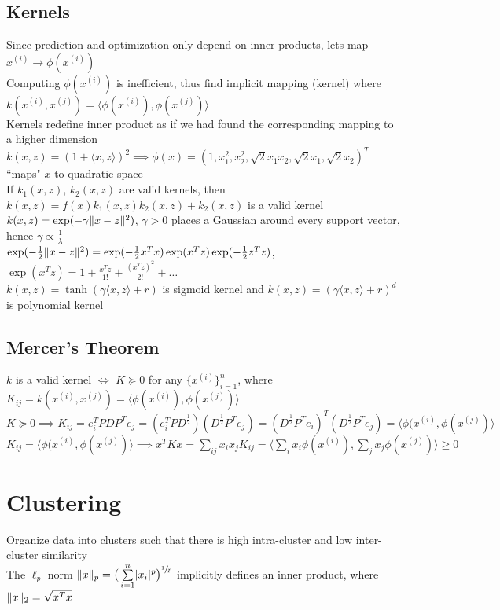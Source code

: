 \documentclass{article}
\newcommand\inner[2]{\langle #1, #2 \rangle}
\DeclarePairedDelimiter\abs{\lvert}{\rvert}
\DeclarePairedDelimiter\norm{\lVert}{\rVert}
\begin{document}
\subsection{Kernels}
Since prediction and optimization only depend on inner products, lets map $x^{(i)} \to \phi(x^{(i)})$ \\
Computing $\phi(x^{(i)})$ is inefficient, thus find implicit mapping (kernel) where $k(x^{(i)}, x^{(j)}) = \inner{\phi(x^{(i)})}{\phi(x^{(j)})}$ \\
Kernels redefine inner product as if we had found the corresponding mapping to a higher dimension \\
$k(x,z) = (1 + \inner{x}{z})^2 \implies \phi(x) = (1, x_1^2, x_2^2, \sqrt{2}x_1x_2, \sqrt{2}x_1, \sqrt{2}x_2)^T$ ``maps" $x$ to quadratic space \\
If $k_1(x, z)$, $k_2(x, z)$ are valid kernels, then $k(x, z) = f(x)k_1(x, z)k_2(x, z) + k_2(x, z)$ is a valid kernel \\
$k(x, z) = \exp(-\gamma \norm{x-z}^2)$, $\gamma > 0$ places a Gaussian around every support vector, hence $\gamma \propto \frac{1}{\lambda}$ \\
$\exp(-\frac{1}{2}\norm{x-z}^2) = \exp(-\frac{1}{2}x^Tx)\exp(x^Tz)\exp(-\frac{1}{2}z^Tz)$, $\exp(x^Tz) = 1 + \frac{x^Tz}{1!} + \frac{(x^Tz)^2}{2!} + \ldots$ \\
$k(x,z) = \tanh(\gamma\inner{x}{z} + r)$ is sigmoid kernel and $k(x, z) = (\gamma\inner{x}{z} + r)^d$ is polynomial kernel

\subsection{Mercer's Theorem}
$k$ is a valid kernel $\iff$ $K \succeq 0$ for any $\{x^{(i)}\}_{i=1}^n$, where $K_{ij} = k(x^{(i)}, x^{(j)})  = \inner{\phi(x^{(i)})}{\phi(x^{(j)})}$ \\
$K \succeq 0 \implies K_{ij} = e_i^TPDP^Te_j = (e_i^TPD^{\frac{1}{2}})(D^{\frac{1}{2}}P^Te_j) = (D^\frac{1}{2}P^Te_i)^T(D^\frac{1}{2}P^Te_j) = \inner{\phi(x^{(i)}}{\phi(x^{(j)})}$ \\
$K_{ij} = \inner{\phi(x^{(i)}}{\phi(x^{(j)})} \implies x^TKx = \sum_{ij} x_ix_j K_{ij} = \inner{\sum_i x_i \phi(x^{(i)})}{\sum_j x_j \phi(x^{(j)})} \geq 0 $


\newpage
\section{Clustering}
Organize data into clusters such that there is high intra-cluster and low inter-cluster similarity \\
The $\ell_p$ norm $\norm{x}_p = \big(\sum\limits_{i=1}^n \abs{x_i}^p \big)^{\sfrac{1}{p}}$ implicitly defines an inner product, where $\norm{x}_2 =  \sqrt{x^Tx}$ 
\end{document}
